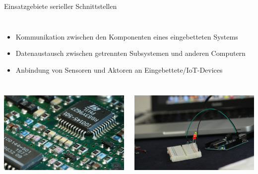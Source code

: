 \begin{frame}{Einsatzgebiete serieller Schnittstellen}
    \begin{columns}
        \column{\dimexpr\paperwidth-28pt}
        \begin{itemize}
            \item Kommunikation zwischen den Komponenten eines eingebetteten Systems
            \item Datenaustausch zwischen getrennten Subsystemen und anderen Computern
            \item Anbindung von Sensoren und Aktoren an Eingebettete/IoT-Devices
        \end{itemize}
    \end{columns}

    \bigskip
    \bigskip
    \bigskip

    \begin{columns}
        \includegraphics[width=\textwidth]{2-hardwaredesign/img/seriell_einsatz1}

        \includegraphics[width=\textwidth]{2-hardwaredesign/img/seriell_einsatz2}


\end{columns}
\end{frame}
